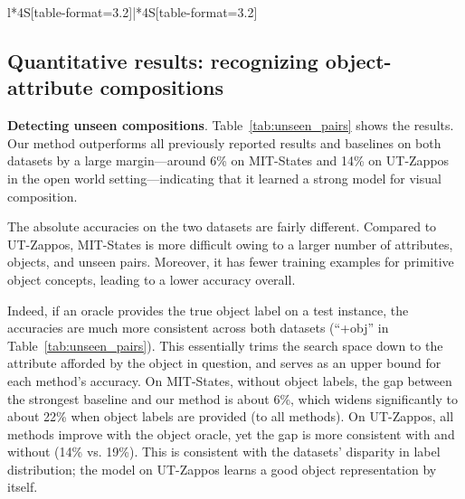 \documentclass[runningheads]{llncs}
\newcommand{\reftbl}[1]{Table~\ref{#1}}
\begin{document}
\begin{table*}[t]
\begin{tabular}{l*{4}{S[table-format=3.2]}|*{4}{S[table-format=3.2]}}
\bottomrule
\end{tabular}
\caption{\textbf{Accuracy (\%) on unseen pair detection.} Our method outperforms all previous methods in the open world setting.  It also is strongest in the consolidated harmonic mean (h-mean) metric that accounts for both the open and closed settings. Our method's gain is significantly wider when we eliminate the pressure caused by scarce object training data, by providing oracle object labels during inference to all methods (``+obj"). The harmonic mean is calculated over the open and closed settings only (it does not factor in +obj).}
\vspace*{-0.25in}
\label{tab:unseen_pairs}
\end{table*}

\subsection{Quantitative results: recognizing object-attribute compositions}

\noindent\textbf{Detecting unseen compositions}. 
\reftbl{tab:unseen_pairs} shows the results. Our method outperforms all previously reported results and baselines on both datasets by a large margin---around 6\% on MIT-States and 14\% on UT-Zappos in the open world setting---indicating that it learned a strong model for visual composition.

The absolute accuracies on the two datasets are fairly different. Compared to UT-Zappos, MIT-States is more difficult owing to a larger number of attributes, objects, and unseen pairs. Moreover, it has fewer training examples for primitive object concepts, leading to a lower accuracy overall.

Indeed, if an oracle provides the true object label on a test instance, the accuracies are much more consistent across both datasets  (``+obj'' in \reftbl{tab:unseen_pairs}). This essentially trims the search space down to the attribute afforded by the object in question, and serves as an upper bound for each method's accuracy. On MIT-States, without object labels, the gap between the strongest baseline and our method is about 6\%, which widens significantly to about 22\% when object labels are provided (to all methods). On UT-Zappos, all methods improve with the object oracle, yet the gap is more consistent with and without (14\% vs. 19\%).  This is consistent with the datasets' disparity in label distribution; the model on UT-Zappos learns a good object representation by itself. 
\end{document}
